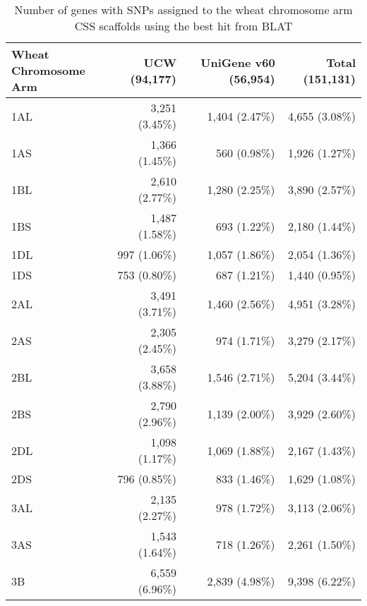 \begin{table}
\centering
\caption{ Number of genes with SNPs assigned to the wheat chromosome arm CSS scaffolds \citep{Mayer2014} using the best hit from BLAT \citep{Kent2002} }
\label{tab:yr15:genesToCSS}
\begin{localsize}{10}{12}
\begin{tabular}{lrrr}
\toprule
 \pbox{2.2cm}{Wheat \\Chromosome Arm}    & UCW (94,177)    & UniGene v60 (56,954)   & Total (151,131)   \\
\midrule
 1AL                     & 3,251 (3.45\%)   & 1,404 (2.47\%)          & 4,655 (3.08\%)     \\
 1AS                     & 1,366 (1.45\%)   & 560 (0.98\%)            & 1,926 (1.27\%)     \\
 1BL                     & 2,610 (2.77\%)   & 1,280 (2.25\%)          & 3,890 (2.57\%)     \\
 1BS                     & 1,487 (1.58\%)   & 693 (1.22\%)            & 2,180 (1.44\%)     \\
 1DL                     & 997 (1.06\%)     & 1,057 (1.86\%)          & 2,054 (1.36\%)     \\
 1DS                     & 753 (0.80\%)     & 687 (1.21\%)            & 1,440 (0.95\%)     \\
 \midrule
 2AL                     & 3,491 (3.71\%)   & 1,460 (2.56\%)          & 4,951 (3.28\%)     \\
 2AS                     & 2,305 (2.45\%)   & 974 (1.71\%)            & 3,279 (2.17\%)     \\
 2BL                     & 3,658 (3.88\%)   & 1,546 (2.71\%)          & 5,204 (3.44\%)     \\
 2BS                     & 2,790 (2.96\%)   & 1,139 (2.00\%)          & 3,929 (2.60\%)     \\
 2DL                     & 1,098 (1.17\%)   & 1,069 (1.88\%)          & 2,167 (1.43\%)     \\
 2DS                     & 796 (0.85\%)     & 833 (1.46\%)            & 1,629 (1.08\%)     \\
 \midrule
 3AL                     & 2,135 (2.27\%)   & 978 (1.72\%)            & 3,113 (2.06\%)     \\
 3AS                     & 1,543 (1.64\%)   & 718 (1.26\%)            & 2,261 (1.50\%)     \\
 3B                      & 6,559 (6.96\%)   & 2,839 (4.98\%)          & 9,398 (6.22\%)     \\

\end{tabular}
\end{localsize}
\end{table}
